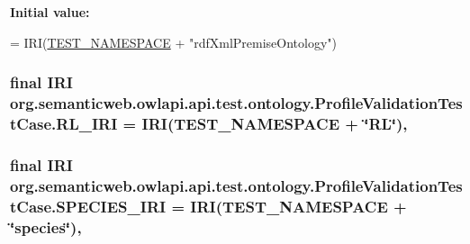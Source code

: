 {\bfseries Initial value\-:}
\begin{DoxyCode}
= IRI(\hyperlink{classorg_1_1semanticweb_1_1owlapi_1_1api_1_1test_1_1ontology_1_1_profile_validation_test_case_a04eaa9905dbac33bf9d2784b8f2993a3}{TEST\_NAMESPACE}
            + \textcolor{stringliteral}{"rdfXmlPremiseOntology"})
\end{DoxyCode}
\hypertarget{classorg_1_1semanticweb_1_1owlapi_1_1api_1_1test_1_1ontology_1_1_profile_validation_test_case_ad42835982c01ac38cecc901d7cee07d8}{
\subsubsection[{R\-L\-\_\-\-I\-R\-I}]{\setlength{\rightskip}{0pt plus 5cm}final {\bf I\-R\-I} org.\-semanticweb.\-owlapi.\-api.\-test.\-ontology.\-Profile\-Validation\-Test\-Case.\-R\-L\-\_\-\-I\-R\-I = {\bf I\-R\-I}({\bf T\-E\-S\-T\-\_\-\-N\-A\-M\-E\-S\-P\-A\-C\-E} + \char`\"{}R\-L\char`\"{})\hspace{0.3cm}{\ttfamily [static]}, {\ttfamily [private]}}}\label{classorg_1_1semanticweb_1_1owlapi_1_1api_1_1test_1_1ontology_1_1_profile_validation_test_case_ad42835982c01ac38cecc901d7cee07d8}
\hypertarget{classorg_1_1semanticweb_1_1owlapi_1_1api_1_1test_1_1ontology_1_1_profile_validation_test_case_addc2ad676e3ebd1310f59afc73e85a80}{
\subsubsection[{S\-P\-E\-C\-I\-E\-S\-\_\-\-I\-R\-I}]{\setlength{\rightskip}{0pt plus 5cm}final {\bf I\-R\-I} org.\-semanticweb.\-owlapi.\-api.\-test.\-ontology.\-Profile\-Validation\-Test\-Case.\-S\-P\-E\-C\-I\-E\-S\-\_\-\-I\-R\-I = {\bf I\-R\-I}({\bf T\-E\-S\-T\-\_\-\-N\-A\-M\-E\-S\-P\-A\-C\-E} + \char`\"{}species\char`\"{})\hspace{0.3cm}{\ttfamily [static]}, {\ttfamily [private]}}}\label{classorg_1_1semanticweb_1_1owlapi_1_1api_1_1test_1_1ontology_1_1_profile_validation_test_case_addc2ad676e3ebd1310f59afc73e85a80}
